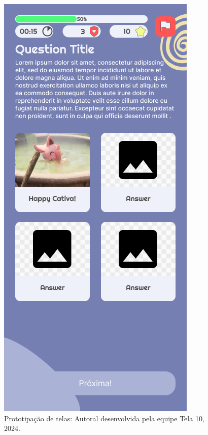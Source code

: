 \documentclass[12pt, openany, oneside, a4paper, english, brazil]{abntex2}   %
\begin{document}
\begin{figure}
    \centering
    \includegraphics[scale=0.7]{figuras/Math.Pow App/Question Multiple Choice Image With Text.png}
    \caption{Prototipação de telas: Autoral desenvolvida pela equipe Tela 10, 2024.}
    \label{fig:nome-da-imagem}
\end{figure}
\end{document}
